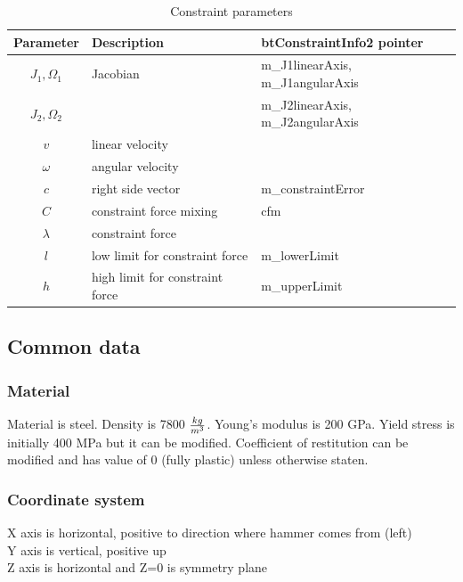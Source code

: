 \begin {table}[htb!]
\begin{center}
\begin{tabular}{|c| l| l|}
\hline
{\bf Parameter} & {\bf Description} & {\bf btConstraintInfo2 pointer}\\  \hline
$J_1, \Omega_1$ & Jacobian & m\_J1linearAxis, m\_J1angularAxis \\ 
$J_2, \Omega_2$ & & m\_J2linearAxis, m\_J2angularAxis \\ \hline
$v$ & linear velocity & \\ \hline
$\omega$ & angular velocity & \\ \hline
$c$        &  right side vector   & m\_constraintError \\ \hline
$C$  & constraint force mixing & cfm \\  \hline
$\lambda$ & constraint force &  \\ \hline
$l$ & low limit for constraint force & m\_lowerLimit \\ \hline
$h$ & high limit for constraint force & m\_upperLimit \\ \hline
\end {tabular}
\end{center}
\caption {Constraint parameters} \label{tab:constraintParameters} 
\end {table}

\subsection{Common data}

\subsubsection{Material}

Material is steel. Density is 7800 $kg\over{m^{3}}$. Young’s modulus is 200 GPa. Yield stress is initially 400 MPa but it can be modified.
Coefficient of restitution can be modified and has value of 0 (fully plastic) unless otherwise staten.

\subsubsection{Coordinate system}

X axis is horizontal, positive to direction where hammer comes from (left)\\
Y axis is vertical, positive up\\
Z axis is horizontal and Z=0 is symmetry plane

